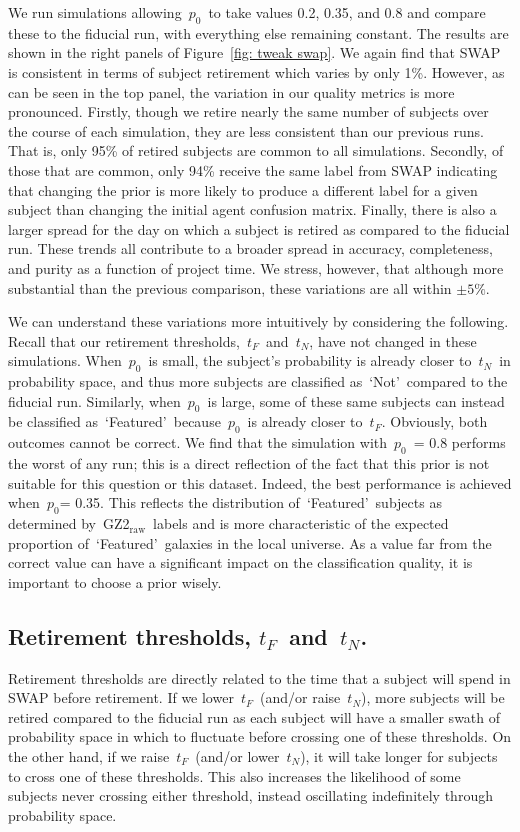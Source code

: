 \documentclass[twocolumn,  trackchanges, ]{aastex6}%
\newcommand{\p}{$p_0$}
\newcommand{\tf}{$t_F$}
\newcommand{\tn}{$t_N$}
\newcommand{\feat}{`Featured'}
\newcommand{\notfeat}{`Not'}
\newcommand{\raw}{GZ2$_{\text{raw}}$}
\begin{document}
We run simulations allowing~\p~to take values 0.2, 0.35, and 0.8 
and compare these to the fiducial run, with everything else remaining constant.
The results are shown in the right panels of Figure~\ref{fig: tweak swap}. 
We again find that SWAP is consistent in terms of subject retirement which varies by only 1\%. 
However, as can be seen in the top panel, the variation in our quality metrics is 
more pronounced. 
Firstly, though we retire nearly the same number of subjects over the course
of each simulation, they are less consistent than our previous runs. That is, 
only 95\% of retired subjects are common to all simulations. Secondly, of those that are 
common, only 94\% receive the same label from SWAP indicating that changing the prior 
is more likely to produce a different label for a given subject than changing the initial 
agent confusion matrix. Finally, there is also a larger spread for the day on which a subject 
is retired as compared to the fiducial run. These trends all contribute to a broader 
spread in accuracy, completeness, and purity as a function of project time.
We stress, however, that although more substantial than the previous comparison, 
these variations are all within $\pm5\%$. 

We can understand these variations more intuitively by considering the following.
Recall that our retirement thresholds,~\tf~and~\tn, have not changed in these simulations. 
When~\p~is small, the subject's probability is already closer to~\tn~in probability space, 
and thus more subjects are classified as~\notfeat~compared to the fiducial run.
Similarly, when~\p~is large, some of these same subjects can instead be classified
as~\feat~because~\p~is already closer to~\tf. Obviously, both outcomes cannot be correct. 
We find that the simulation with~\p~= 0.8 performs the worst of any run; 
this is a direct reflection of the fact that this prior is not suitable for this question or this dataset. 
 Indeed, the best performance is achieved when~\p = 0.35.  This reflects the 
distribution of~\feat~subjects as determined by~\raw~labels and is more characteristic
of the expected proportion of~\feat~galaxies in the local universe.
As a value far from the correct value can have a significant impact on the classification
quality, it is important to choose a prior wisely.
 


\subsection{Retirement thresholds, \tf~and~\tn.}
Retirement thresholds are directly related to the time that a subject will spend
in SWAP before retirement.  If we lower~\tf~(and/or raise~\tn), more subjects will be retired
compared to the fiducial run as each subject will have a smaller swath of probability space
in which to fluctuate before crossing one of these thresholds.
On the other hand, if we raise~\tf~(and/or lower~\tn), it will take longer for subjects
to cross one of these thresholds. This also increases the likelihood of some subjects 
never crossing either threshold, instead oscillating indefinitely through probability space.
\end{document}
